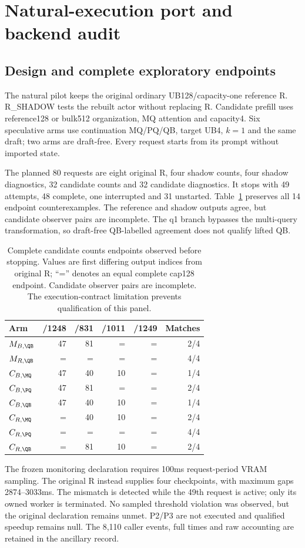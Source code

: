 \section{Natural-execution port and backend audit}
\label{supp:pilot}
\subsection{Design and complete exploratory endpoints}
The natural pilot keeps the original ordinary UB128/capacity-one reference R. R\_SHADOW tests the rebuilt actor without replacing R. Candidate prefill uses reference128 or bulk512 organization, MQ attention and capacity4. Six speculative arms use continuation MQ/PQ/QB, target UB4, $k=1$ and the same draft; two arms are draft-free. Every request starts from its prompt without imported state.

The planned 80 requests are eight original R, four shadow counts, four shadow diagnostics, 32 candidate counts and 32 candidate diagnostics. It stops with 49 attempts, 48 complete, one interrupted and 31 unstarted. Table~\ref{tab:pilot} preserves all 14 endpoint counterexamples. The reference and shadow outputs agree, but candidate observer pairs are incomplete. The q1 branch bypasses the multi-query transformation, so draft-free QB-labelled agreement does not qualify lifted QB.
\begin{table}[t]\centering\small
\caption{Complete candidate counts endpoints observed before stopping. Values are first differing output indices from original R; ``='' denotes an equal complete cap128 endpoint. Candidate observer pairs are incomplete. The execution-contract limitation prevents qualification of this panel.}
\label{tab:pilot}
\begin{tabular}{@{}lrrrrr@{}}\toprule
Arm&/1248&/831&/1011&/1249&Matches\\\midrule
$M_{B,\QB}$&47&81&=&=&2/4\\
$M_{R,\QB}$&=&=&=&=&4/4\\
$C_{B,\MQ}$&47&40&10&=&1/4\\
$C_{B,\PQ}$&47&81&=&=&2/4\\
$C_{B,\QB}$&47&40&10&=&1/4\\
$C_{R,\MQ}$&=&40&10&=&2/4\\
$C_{R,\PQ}$&=&=&=&=&4/4\\
$C_{R,\QB}$&=&81&10&=&2/4\\\bottomrule
\end{tabular}
\end{table}
The frozen monitoring declaration requires 100ms request-period VRAM sampling. The original R instead supplies four checkpoints, with maximum gaps 2874--3033ms. The mismatch is detected while the 49th request is active; only its owned worker is terminated. No sampled threshold violation was observed, but the original declaration remains unmet. P2/P3 are not executed and qualified speedup remains null. The 8,110 caller events, full times and raw accounting are retained in the ancillary record.

